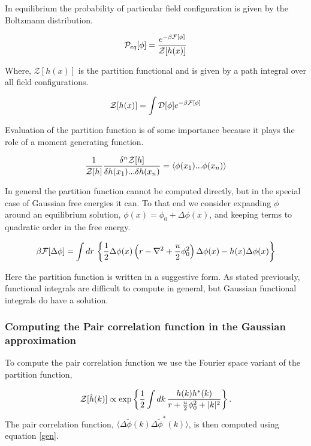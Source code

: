 In equilibrium the probability of particular field configuration is given by
the Boltzmann distribution.

\begin{equation} \mathcal{P}_{eq}[\phi] =
\frac{e^{-\beta\mathcal{F}[\phi]}}{\mathcal{Z}[h(x)]} \end{equation}

Where, $\mathcal{Z}[h(x)]$ is the partition functional and is given by a path
integral over all field configurations.

\begin{equation} \mathcal{Z}[h(x)] = \int \mathcal{D}[\phi] e^{-\beta\mathcal{F}[\phi]}
\end{equation}

Evaluation of the partition function is of some importance because it plays the
role of a moment generating function.

\begin{equation}\label{gen} \frac{1}{\mathcal{Z}[h]}\frac{\delta^n \mathcal{Z}[h]}{\delta
h(x_1)...\delta h(x_n)} = \langle \phi(x_1)...\phi(x_n)\rangle \end{equation}

In general the partition function cannot be computed directly, but in the
special case of Gaussian free energies it can. To that end we consider
expanding $\phi$ around an equilibrium solution, $\phi(x) = \phi_0 +
\Delta\phi(x)$, and keeping terms to quadratic order in the free energy.

\begin{equation} \beta\mathcal{F}[\Delta\phi] = \int dr \,\left\lbrace
\frac{1}{2}\Delta\phi(x) \left(r - \nabla^2 + \frac{u}{2}\phi_0^2\right)
\Delta\phi(x) - h(x)\Delta\phi(x) \right\rbrace \end{equation}

Here the partition function is written in a suggestive form. As stated
previously, functional integrals are difficult to compute in general, but
Gaussian functional integrals do have a solution.

\subsubsection{Computing the Pair correlation function in the Gaussian
approximation}

To compute the pair correlation function we use the Fourier space variant of
the partition function,

\begin{equation} \mathcal{Z}[\tilde{h}(k)] \propto \exp\left\lbrace \frac{1}{2}\int
dk\,\frac{h(k)h^{*}(k)}{r + \frac{u}{2}\phi_0^2 +  \vert k \vert^2}\right\rbrace.
\end{equation} The pair correlation function, $\langle
\Delta\tilde{\phi}(k)\Delta\tilde{\phi}^{*}(k)\rangle$, is then computed using
equation \ref{gen}.

